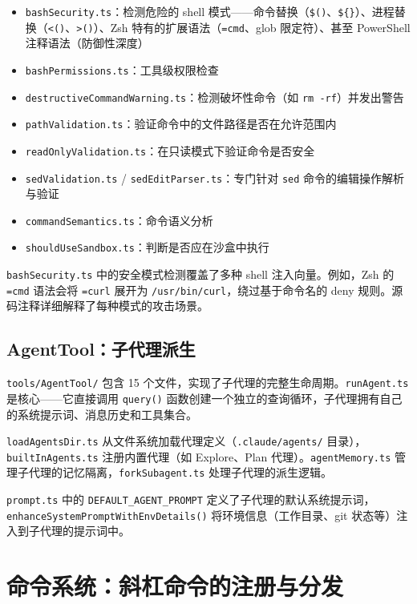 \begin{itemize}
  \item \texttt{bashSecurity.ts}：检测危险的 shell 模式——命令替换（\texttt{\$()}、\texttt{\$\{\}}）、进程替换（\texttt{<()}、\texttt{>()}）、Zsh 特有的扩展语法（\texttt{=cmd}、glob 限定符）、甚至 PowerShell 注释语法（防御性深度）
  \item \texttt{bashPermissions.ts}：工具级权限检查
  \item \texttt{destructiveCommandWarning.ts}：检测破坏性命令（如 \texttt{rm -rf}）并发出警告
  \item \texttt{pathValidation.ts}：验证命令中的文件路径是否在允许范围内
  \item \texttt{readOnlyValidation.ts}：在只读模式下验证命令是否安全
  \item \texttt{sedValidation.ts} / \texttt{sedEditParser.ts}：专门针对 \texttt{sed} 命令的编辑操作解析与验证
  \item \texttt{commandSemantics.ts}：命令语义分析
  \item \texttt{shouldUseSandbox.ts}：判断是否应在沙盒中执行
\end{itemize}

\texttt{bashSecurity.ts} 中的安全模式检测覆盖了多种 shell 注入向量。例如，Zsh 的 \texttt{=cmd} 语法会将 \texttt{=curl} 展开为 \texttt{/usr/bin/curl}，绕过基于命令名的 deny 规则。源码注释详细解释了每种模式的攻击场景。

\subsection{AgentTool：子代理派生}

\texttt{tools/AgentTool/} 包含 15 个文件，实现了子代理的完整生命周期。\texttt{runAgent.ts} 是核心——它直接调用 \texttt{query()} 函数创建一个独立的查询循环，子代理拥有自己的系统提示词、消息历史和工具集合。

\texttt{loadAgentsDir.ts} 从文件系统加载代理定义（\texttt{.claude/agents/} 目录），\texttt{builtInAgents.ts} 注册内置代理（如 Explore、Plan 代理）。\texttt{agentMemory.ts} 管理子代理的记忆隔离，\texttt{forkSubagent.ts} 处理子代理的派生逻辑。

\texttt{prompt.ts} 中的 \texttt{DEFAULT\_AGENT\_PROMPT} 定义了子代理的默认系统提示词，\texttt{enhanceSystemPromptWithEnvDetails()} 将环境信息（工作目录、git 状态等）注入到子代理的提示词中。

\section{命令系统：斜杠命令的注册与分发}

